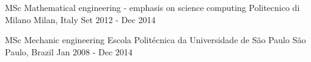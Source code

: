 

\begin{cventries}

  \cventryFour
    {MSc Mathematical engineering - emphasis on science computing} %
    {Politecnico di Milano} %
    {Milan, Italy} %
    {Set 2012 - Dec 2014} %

  \cventryFour
    {MSc Mechanic engineering} %
    {Escola Politécnica da Universidade de São Paulo} %
    {São Paulo, Brazil} %
    {Jan 2008 - Dec 2014} %
\end{cventries}

